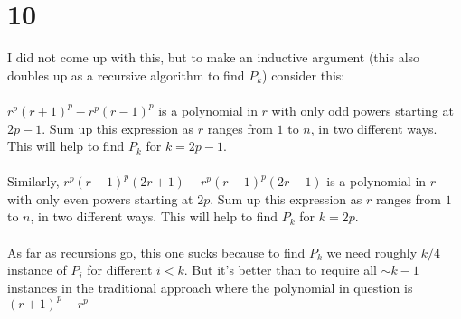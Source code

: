 \documentclass{article}
\begin{document}
\section*{10}
I did not come up with this, but to make an inductive argument (this also doubles up as a recursive algorithm to find $P_k$) consider this:
\\\\
$r^p(r+1)^p - r^p(r-1)^p$ is a polynomial in $r$ with only odd powers starting at $2p-1$. Sum up this expression as $r$ ranges from $1$ to $n$, in two different ways. This will help to find $P_k$ for $k = 2p-1$.
\\\\
Similarly, $r^p(r+1)^p(2r+1) - r^p(r-1)^p(2r-1)$ is a polynomial in $r$ with only even powers starting at $2p$. Sum up this expression as $r$ ranges from $1$ to $n$, in two different ways. This will help to find $P_k$ for $k = 2p$.
\\\\
As far as recursions go, this one sucks because to find $P_k$ we need roughly $k/4$ instance of $P_i$ for different $i<k$. But it's better than to require all $\sim k-1$ instances in the traditional approach where the polynomial in question is $(r+1)^p-r^p$
\end{document}
